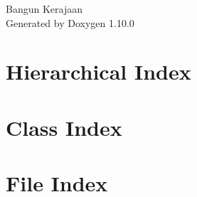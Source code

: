 \documentclass[twoside]{book}
\newcommand{\+}{\discretionary{\mbox{\scriptsize$\hookleftarrow$}}{}{}}
\newcommand{\clearemptydoublepage}{%
    \newpage{\pagestyle{empty}\cleardoublepage}%
  }
\begin{document}
  \raggedbottom
    \hypersetup{pageanchor=false,
                bookmarksnumbered=true,
                pdfencoding=unicode
               }
  \begin{titlepage}
  \vspace*{7cm}
  \begin{center}%
  {\Large Bangun Kerajaan}\\
  \vspace*{1cm}
  {\large Generated by Doxygen 1.10.0}\\
  \end{center}
  \end{titlepage}
  \clearemptydoublepage
  \tableofcontents
  \clearemptydoublepage
  \hypersetup{pageanchor=true}
\chapter{Hierarchical Index}

\chapter{Class Index}

\chapter{File Index}

\end{document}
